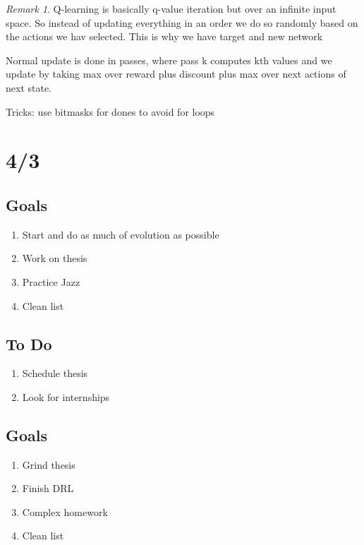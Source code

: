 \documentclass[11pt]{article}
\theoremstyle{remark}
\newtheorem{remark}{Remark}
\begin{document}
\begin{remark}
	Q-learning is basically q-value iteration but over an infinite input space. So instead of updating everything in an order we do so randomly based on the actions we hav selected. This is why we have target and new network

	Normal update is done in passes, where pass k computes kth values and we update by taking max over reward plus discount plus max over next actions of next state.
\end{remark}

Tricks: use bitmasks for dones to avoid for loops

\section{4/3}

\subsection{Goals}


\begin{enumerate}
	\item Start and do as much of evolution as possible
	\item Work on thesis
	\item Practice Jazz
	\item Clean list
\end{enumerate}

\subsection{To Do}

\begin{enumerate}
	\item Schedule thesis 
	\item Look for internships
\end{enumerate}


\subsection{Goals}

\begin{enumerate}
	\item Grind thesis
	\item Finish DRL
	\item Complex homework
	\item Clean list
\end{enumerate}
\end{document}
